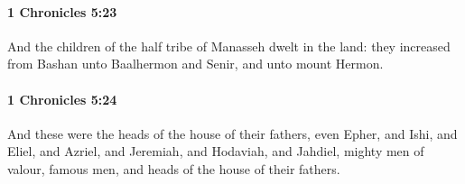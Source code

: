 		\paragraph{1 Chronicles 5:23} %
			\label{1CHRONICLES-5-23}

			And the children of the half tribe of Manasseh dwelt in the land: they increased from Bashan unto Baalhermon and Senir, and unto mount Hermon.


		\paragraph{1 Chronicles 5:24} %
			\label{1CHRONICLES-5-24}

			And these were the heads of the house of their fathers, even Epher, and Ishi, and Eliel, and Azriel, and Jeremiah, and Hodaviah, and Jahdiel, mighty men of valour, famous men, and heads of the house of their fathers.

